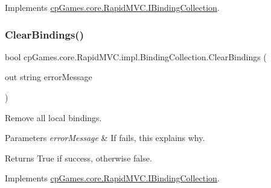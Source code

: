 Implements \mbox{\hyperlink{interfacecp_games_1_1core_1_1_rapid_m_v_c_1_1_i_binding_collection_a2a468c5570b780133763d9592e2c1cb5}{cp\+Games.\+core.\+Rapid\+M\+V\+C.\+I\+Binding\+Collection}}.

\mbox{\label{classcp_games_1_1core_1_1_rapid_m_v_c_1_1impl_1_1_binding_collection_a131a853ccd88179353f3a875cccc7637}} 
\subsubsection{\texorpdfstring{ClearBindings()}{ClearBindings()}}
{\footnotesize\ttfamily bool cp\+Games.\+core.\+Rapid\+M\+V\+C.\+impl.\+Binding\+Collection.\+Clear\+Bindings (\begin{DoxyParamCaption}\item[{out string}]{error\+Message }\end{DoxyParamCaption})}



Remove all local bindings. 


\begin{DoxyParams}{Parameters}
{\em error\+Message} & If fails, this explains why.\\
\hline
\end{DoxyParams}
\begin{DoxyReturn}{Returns}
True if success, otherwise false.
\end{DoxyReturn}


Implements \mbox{\hyperlink{interfacecp_games_1_1core_1_1_rapid_m_v_c_1_1_i_binding_collection_a81689073a35a424a96982276d64a27ad}{cp\+Games.\+core.\+Rapid\+M\+V\+C.\+I\+Binding\+Collection}}.

\mbox{\label{classcp_games_1_1core_1_1_rapid_m_v_c_1_1impl_1_1_binding_collection_a8678a2a0afd24bc6137ec2a44eea6cea}} 
